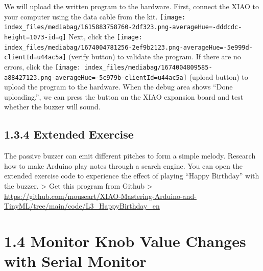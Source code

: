 \documentclass[
  letterpaper,
  DIV=11,
  numbers=noendperiod]{scrreprt}
\begin{document}
We will upload the written program to the hardware. First, connect the
XIAO to your computer using the data cable from the kit.
\texttt{[image: index\_files/mediabag/1615883758760-2df323.png-averageHue=-dddcdc-height=1073-id=q]}
Next, click the
\texttt{[image: index\_files/mediabag/1674004781256-2ef9b2123.png-averageHue=-5e999d-clientId=u44ac5a]}
(verify button) to validate the program. If there are no errors, click
the
\texttt{[image: index\_files/mediabag/1674004809585-a88427123.png-averageHue=-5c979b-clientId=u44ac5a]}
(upload button) to upload the program to the hardware. When the debug
area shows ``Done uploading.'', we can press the button on the XIAO
expansion board and test whether the buzzer will sound.

\hypertarget{extended-exercise-1}{%
\section*{1.3.4 Extended Exercise}\label{extended-exercise-1}}


The passive buzzer can emit different pitches to form a simple melody.
Research how to make Arduino play notes through a search engine. You can
open the extended exercise code to experience the effect of playing
``Happy Birthday'' with the buzzer. \textgreater{} Get this program from
Github \textgreater{}
\url{https://github.com/mouseart/XIAO-Mastering-Arduino-and-TinyML/tree/main/code/L3_HappyBirthday_en}


\hypertarget{monitor-knob-value-changes-with-serial-monitor}{%
\chapter*{1.4 Monitor Knob Value Changes with Serial
Monitor}\label{monitor-knob-value-changes-with-serial-monitor}}

\end{document}

